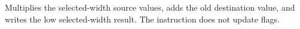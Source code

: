 Multiplies the selected-width source values, adds the old destination value, and writes the low selected-width
result. The instruction does not update flags.
